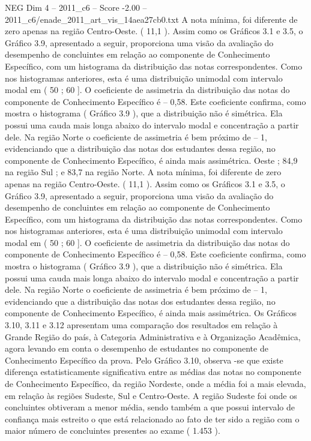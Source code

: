 \begin{textsample}{NEG Dim 4 – 2011\_c6 – Score -2.00 – 2011\_c6/enade\_2011\_art\_vis\_14aea27cb0.txt}
A nota mínima, foi diferente de zero apenas na região Centro-Oeste. ( 11,1 ).
Assim como os Gráficos 3.1 e 3.5, o Gráfico 3.9, apresentado a seguir, proporciona uma visão da avaliação do desempenho de concluintes em relação ao componente de Conhecimento Específico, com um histograma da distribuição das notas correspondentes.
Como nos histogramas anteriores, esta é uma distribuição unimodal com intervalo modal em ( 50 ; 60 ].
O coeficiente de assimetria da distribuição das notas do componente de Conhecimento Específico é – 0,58.
Este coeficiente confirma, como mostra o histograma ( Gráfico 3.9 ), que a distribuição não é simétrica.
Ela possui uma cauda mais longa abaixo do intervalo modal e concentração a partir dele.
Na região Norte o coeficiente de assimetria é bem próximo de – 1, evidenciando que a distribuição das notas dos estudantes dessa região, no componente de Conhecimento Específico, é ainda mais assimétrica.
Oeste ; 84,9 na região Sul ; e 83,7 na região Norte.
A nota mínima, foi diferente de zero apenas na região Centro-Oeste. ( 11,1 ).
Assim como os Gráficos 3.1 e 3.5, o Gráfico 3.9, apresentado a seguir, proporciona uma visão da avaliação do desempenho de concluintes em relação ao componente de Conhecimento Específico, com um histograma da distribuição das notas correspondentes.
Como nos histogramas anteriores, esta é uma distribuição unimodal com intervalo modal em ( 50 ; 60 ].
O coeficiente de assimetria da distribuição das notas do componente de Conhecimento Específico é – 0,58.
Este coeficiente confirma, como mostra o histograma ( Gráfico 3.9 ), que a distribuição não é simétrica.
Ela possui uma cauda mais longa abaixo do intervalo modal e concentração a partir dele.
Na região Norte o coeficiente de assimetria é bem próximo de – 1, evidenciando que a distribuição das notas dos estudantes dessa região, no componente de Conhecimento Específico, é ainda mais assimétrica.
Os Gráficos 3.10, 3.11 e 3.12 apresentam uma comparação dos resultados em relação à Grande Região do país, à Categoria Administrativa e à Organização Acadêmica, agora levando em conta o desempenho de estudantes no componente de Conhecimento Específico da prova.
Pelo Gráfico 3.10, observa -se que existe diferença estatisticamente significativa entre as médias das notas no componente de Conhecimento Específico, da região Nordeste, onde a média foi a mais elevada, em relação às regiões Sudeste, Sul e Centro-Oeste.
A região Sudeste foi onde os concluintes obtiveram a menor média, sendo também a que possui intervalo de confiança mais estreito o que está relacionado ao fato de ter sido a região com o maior número de concluintes presentes ao exame ( 1.453 ).

\end{textsample}
